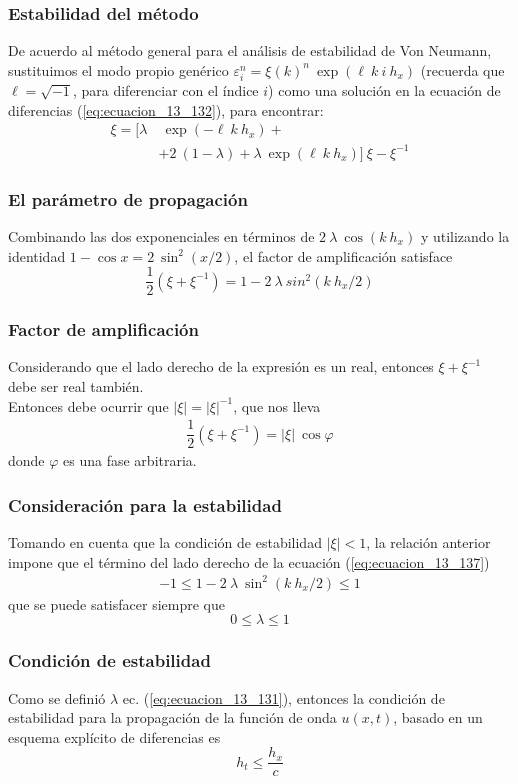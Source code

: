 \begin{frame}
\frametitle{Estabilidad del método}
De acuerdo al método general para el análisis de estabilidad de Von Neumann, sustituimos el modo propio genérico $\varepsilon_{i}^{n} = \xi(k)^{n} \: \exp(\ell \: k \: i \: h_{x})$ (recuerda que $\ell = \sqrt{-1}$, para diferenciar con el índice $i$) como una solución en la ecuación de diferencias (\ref{eq:ecuacion_13_132}), para encontrar:
\begin{align*}
\xi = [ \lambda &\: \exp(- \ell \: k \: h_{x}) + \\
&+  2 \: (1 - \lambda) + \lambda \: \exp(\ell \: k \: h_{x})] \: \xi - \xi^{-1}
\end{align*}
\end{frame}
\begin{frame}
\frametitle{El parámetro de propagación}
Combinando las dos exponenciales en términos de $2 \: \lambda \: \cos(k \: h_{x})$ y utilizando la identidad $1 - \cos x =  2 \: \sin^{2}(x/2)$, el factor de amplificación satisface
\begin{equation}
\dfrac{1}{2} (\xi + \xi^{-1}) = 1 -  2 \: \lambda \: sin^{2}(k \: h_{x} / 2)
\label{eq:ecuacion_13_137}
\end{equation}
\end{frame}
\begin{frame}
\frametitle{Factor de amplificación}
Considerando que el lado derecho de la expresión es un real, entonces $\xi + \xi^{-1}$ debe ser real también.
\\
\bigskip
Entonces debe ocurrir que $\vert \xi \vert = \vert \xi \vert^{-1}$, que nos lleva
\begin{align*}
\dfrac{1}{2} \left( \xi + \xi^{-1} \right) = \vert \xi \vert \: \cos \varphi
\end{align*}
donde $\varphi$ es una fase arbitraria.
\end{frame}
\begin{frame}
\frametitle{Consideración para la estabilidad}
Tomando en cuenta que la condición de estabilidad $\vert \xi \vert < 1$, la relación anterior impone que el término del lado derecho de la ecuación (\ref{eq:ecuacion_13_137})
\begin{align*}
- 1 \leq 1 - 2 \: \lambda \: \sin^{2} (k \: h_{x}/2) \leq 1
\end{align*}
\pause
que se puede satisfacer siempre que
\begin{equation}
0 \leq \lambda \leq 1
\label{eq:ecuacion_13_138}
\end{equation}
\end{frame}
\begin{frame}
\frametitle{Condición de estabilidad}
Como se definió $\lambda$ ec. (\ref{eq:ecuacion_13_131}), entonces la condición de estabilidad para la propagación de la función de onda $u(x, t)$, basado en un esquema explícito de diferencias es
\begin{equation}
h_{t} \leq \dfrac{h_{x}}{c}
\label{eq:ecuacion_13_139}
\end{equation}
\end{frame}
